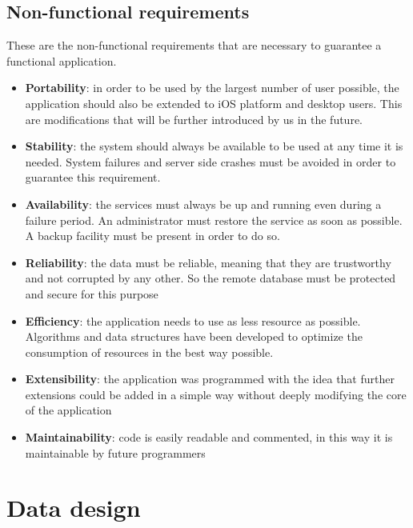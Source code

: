 \documentclass[a4paper]{scrreprt}
\begin{document}
\section{Non-functional requirements}
These are the non-functional requirements that are necessary to guarantee a functional application.
\begin{itemize}
\item \textbf{Portability}: in order to be used by the largest number of user possible, the application should also be extended to iOS platform and desktop users. This are modifications that will be further introduced by us in the future. 
\item \textbf{Stability}: the system should always be available to be used at any time it is needed. System failures and server side crashes must be avoided in order to guarantee this requirement.
\item \textbf{Availability}: the services must always be up and running even during a failure period. An administrator must restore the service as soon as possible. A backup facility must be present in order to do so.
\item \textbf{Reliability}: the data must be reliable, meaning that they are trustworthy and not corrupted by any other. So the remote database must be protected and secure for this purpose
\item\textbf{ Efficiency}: the application needs to use as less resource as possible. Algorithms and data structures have been developed to optimize the consumption of resources in the best way possible. 
\item \textbf{Extensibility}: the application was programmed with the idea that further extensions could be added in a simple way without deeply modifying the core of the application
\item \textbf{Maintainability}: code is easily readable and commented, in this way it is maintainable by future programmers

\end{itemize}

\chapter{Data design}
\end{document}
